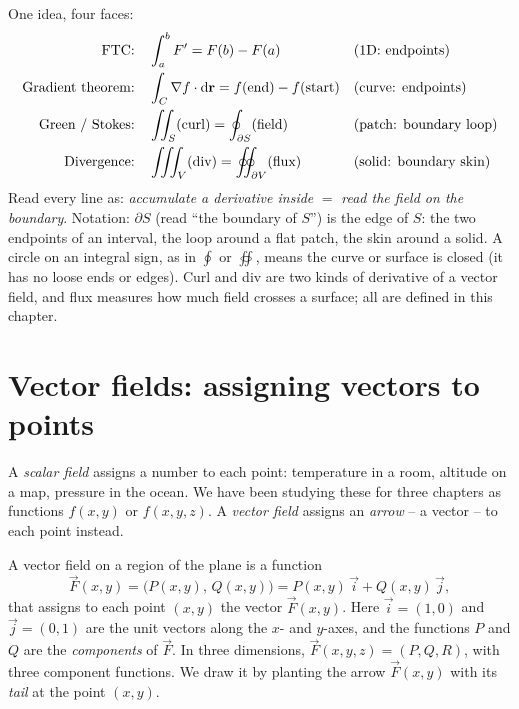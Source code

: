 \begin{focusbox}
One idea, four faces:
\[
\begin{aligned}
\text{FTC:} &\quad \int_a^b F' = F(b)-F(a) &&\text{(1D: endpoints)}\\
\text{Gradient theorem:} &\quad \int_C \nabla f\cdot \mathrm{d}\mathbf{r} = f(\text{end})-f(\text{start}) &&\text{(curve: endpoints)}\\
\text{Green / Stokes:} &\quad \iint_S (\text{curl}) = \oint_{\partial S}(\text{field}) &&\text{(patch: boundary loop)}\\
\text{Divergence:} &\quad \iiint_V (\text{div}) = \oint\kern-0.62em\oint_{\partial V}(\text{flux}) &&\text{(solid: boundary skin)}
\end{aligned}
\]
Read every line as: \emph{accumulate a derivative inside} $=$ \emph{read the
field on the boundary}. Notation: $\partial S$ (read ``the boundary of $S$'') is
the edge of $S$: the two endpoints of an interval, the loop around a flat patch,
the skin around a solid. A circle on an integral sign, as in $\oint$ or $\oiint$,
means the curve or surface is closed (it has no loose ends or edges). Curl and
div are two kinds of derivative of a vector field, and flux measures how much
field crosses a surface; all are defined in this chapter.
\end{focusbox}

\chapterline

\section{Vector fields: assigning vectors to points}
\label{ch35:fields}

A \emph{scalar field} assigns a number to each point: temperature in a room,
altitude on a map, pressure in the ocean. We have been studying these for three
chapters as functions $f(x,y)$ or $f(x,y,z)$. A \emph{vector field} assigns an
\emph{arrow} -- a vector -- to each point instead.

\begin{definition}
\label{ch35:def-field}
A vector field on a region of the plane is a function
\[
  \vec F(x,y) = \big(P(x,y),\, Q(x,y)\big) = P(x,y)\,\vec i + Q(x,y)\,\vec j,
\]
that assigns to each point $(x,y)$ the vector $\vec F(x,y)$. Here $\vec i=(1,0)$
and $\vec j=(0,1)$ are the unit vectors along the $x$- and $y$-axes, and the
functions $P$ and $Q$ are the \emph{components} of $\vec F$. In three dimensions,
$\vec F(x,y,z) = (P,Q,R)$, with three component functions. We draw it by planting
the arrow $\vec F(x,y)$ with its \emph{tail} at the point $(x,y)$.
\end{definition}

